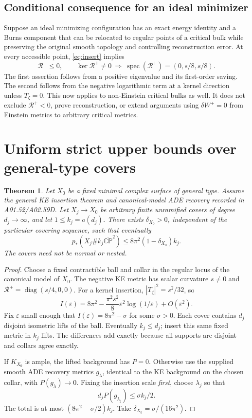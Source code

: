 \documentclass[11pt,a4paper]{article}
\newtheorem{theorem}{Theorem}[section]
\theoremstyle{remark}\newtheorem{remark}[theorem]{Remark}
\newcommand{\CP}{\mathbb{CP}}
\newcommand{\cR}{\mathcal R}
\newcommand{\eps}{\varepsilon}
\begin{document}
\subsection{Conditional consequence for an ideal minimizer}
Suppose an ideal minimizing configuration has an exact energy identity and a Burns component that can be relocated to regular points of a critical bulk while preserving the original smooth topology and controlling reconstruction error. At every accessible point, \eqref{eq:insert} implies
\[
 \cR^+\le0,\qquad
 \ker\cR^+\ne0\ \Longrightarrow\
 \operatorname{spec}(\cR^+)=(0,s/8,s/8).
\]
The first assertion follows from a positive eigenvalue and its first-order saving. The second follows from the negative logarithmic term at a kernel direction unless $T_\zeta=0$.
This now applies to non-Einstein critical bulks as well. It does not exclude $\cR^+<0$, prove reconstruction, or extend arguments using $\delta W^+=0$ from Einstein metrics to arbitrary critical metrics.

\section{Uniform strict upper bounds over general-type covers}
\begin{theorem}\label{thm:cover}
Let $X_0$ be a fixed minimal complex surface of general type. Assume the general KE insertion theorem and canonical-model ADE recovery recorded in A01.52/A02.59D. Let $X_j\to X_0$ be arbitrary finite unramified covers of degree $d_j\to\infty$, and let $1\le k_j=o(d_j)$. There exists $\delta_{X_0}>0$, independent of the particular covering sequence, such that eventually
\[
 p_*(X_j\#k_j\overline{\CP}^2)
 \le8\pi^2(1-\delta_{X_0})k_j.
\]
The covers need not be normal or nested.
\end{theorem}
\begin{proof}
Choose a fixed contractible ball and collar in the regular locus of the canonical model of $X_0$. The negative KE metric has scalar curvature $s\ne0$ and
$\cR^+=\operatorname{diag}(s/4,0,0)$. For a kernel insertion,
$|T_\zeta|^2=s^2/32$, so
\[
 I(\eps)=8\pi^2-\frac{\pi^2s^2}{8}\eps^2\log(1/\eps)+O(\eps^2).
\]
Fix $\eps$ small enough that $I(\eps)=8\pi^2-\sigma$ for some $\sigma>0$.
Each cover contains $d_j$ disjoint isometric lifts of the ball. Eventually $k_j\le d_j$; insert this same fixed metric in $k_j$ lifts. The differences add exactly because all supports are disjoint and collars agree exactly.

If $K_{X_0}$ is ample, the lifted background has $P=0$. Otherwise use the supplied smooth ADE recovery metrics $g_\lambda$, identical to the KE background on the chosen collar, with $P(g_\lambda)\to0$. Fixing the insertion scale \emph{first}, choose $\lambda_j$ so that
\[
 d_jP(g_{\lambda_j})\le\sigma k_j/2.
\]
The total is at most $(8\pi^2-\sigma/2)k_j$. Take
$\delta_{X_0}=\sigma/(16\pi^2)$.
\end{proof}
\end{document}
